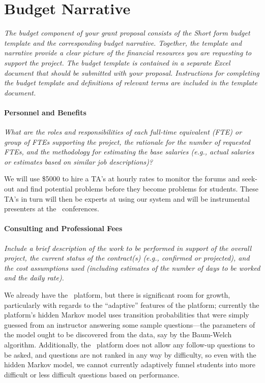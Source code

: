 \section{Budget Narrative}

\textsl{The budget component of your grant proposal consists of the
  Short form budget template and the corresponding budget
  narrative. Together, the template and narrative provide a clear
  picture of the financial resources you are requesting to support the
  project. The budget template is contained in a separate Excel
  document that should be submitted with your proposal. Instructions
  for completing the budget template and definitions of relevant terms
  are included in the template document.}

\paragraph{Personnel and Benefits} 
\textsl{What are the roles and responsibilities of each full-time
  equivalent (FTE) or group of FTEs supporting the project, the
  rationale for the number of requested FTEs, and the methodology for
  estimating the base salaries (e.g., actual salaries or estimates
  based on similar job descriptions)?}

\vspace{\topsep}

We will use \$5000 to hire a TA's at hourly rates to monitor the
forums and seek-out and find potential problems before they become
problems for students. These TA's in turn will then be experts at
using our system and will be instrumental presenters at the
\mooculus\ conferences.


\paragraph{Consulting and Professional Fees}
\textsl{Include a brief description of the work to be performed in
  support of the overall project, the current status of the
  contract(s) (e.g., confirmed or projected), and the cost assumptions
  used (including estimates of the number of days to be worked and the
  daily rate).}

We already have the \mooculus\ platform, but there is significant room
for growth, particularly with regards to the ``adaptive'' features of
the platform; currently the platform's hidden Markov model uses
transition probabilities that were simply guessed from an instructor
answering some sample questions---the parameters of the model ought to
be discovered from the data, say by the Baum-Welch algorithm.
Additionally, the \mooculus\ platform does not allow any follow-up
questions to be asked, and questions are not ranked in any way by
difficulty, so even with the hidden Markov model, we cannot currently
adaptively funnel students into more difficult or less difficult
questions based on performance.

